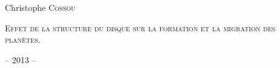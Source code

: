 \documentclass[a4paper]{report}
\begin{document}
\pagestyle{empty}

\noindent
\begin{landscape}
Christophe \textsc{Cossou} \hfill %
\begin{minipage}{0.5\linewidth}%
\begin{center}%
\textsc{Effet de la structure du disque sur la formation et la migration des planètes.}
\end{center}%
\end{minipage}%
\hfill -- 2013 --
\end{landscape}
 
\end{document}
